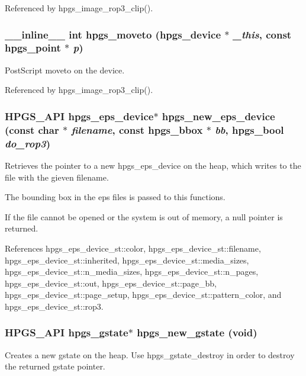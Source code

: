 Referenced by hpgs\_\-image\_\-rop3\_\-clip().

\subsubsection[{hpgs\_\-moveto}]{\setlength{\rightskip}{0pt plus 5cm}\_\-\_\-inline\_\-\_\- int hpgs\_\-moveto ({\bf hpgs\_\-device} $\ast$ {\em \_\-this}, \/  const {\bf hpgs\_\-point} $\ast$ {\em p})\hspace{0.3cm}{\ttfamily  [static]}}\label{group__device_ga02a5a6a75d00357beafb93105f1b2d87}
PostScript moveto on the device. 

Referenced by hpgs\_\-image\_\-rop3\_\-clip().

\subsubsection[{hpgs\_\-new\_\-eps\_\-device}]{\setlength{\rightskip}{0pt plus 5cm}HPGS\_\-API {\bf hpgs\_\-eps\_\-device}$\ast$ hpgs\_\-new\_\-eps\_\-device (const char $\ast$ {\em filename}, \/  const {\bf hpgs\_\-bbox} $\ast$ {\em bb}, \/  hpgs\_\-bool {\em do\_\-rop3})}\label{group__device_ga576f0a343948b709f8099bb0ec668ef6}
Retrieves the pointer to a new {\ttfamily hpgs\_\-eps\_\-device} on the heap, which writes to the file with the gieven {\ttfamily filename}.

The bounding box in the eps files is passed to this functions.

If the file cannot be opened or the system is out of memory, a null pointer is returned. 

References hpgs\_\-eps\_\-device\_\-st::color, hpgs\_\-eps\_\-device\_\-st::filename, hpgs\_\-eps\_\-device\_\-st::inherited, hpgs\_\-eps\_\-device\_\-st::media\_\-sizes, hpgs\_\-eps\_\-device\_\-st::n\_\-media\_\-sizes, hpgs\_\-eps\_\-device\_\-st::n\_\-pages, hpgs\_\-eps\_\-device\_\-st::out, hpgs\_\-eps\_\-device\_\-st::page\_\-bb, hpgs\_\-eps\_\-device\_\-st::page\_\-setup, hpgs\_\-eps\_\-device\_\-st::pattern\_\-color, and hpgs\_\-eps\_\-device\_\-st::rop3.

\subsubsection[{hpgs\_\-new\_\-gstate}]{\setlength{\rightskip}{0pt plus 5cm}HPGS\_\-API {\bf hpgs\_\-gstate}$\ast$ hpgs\_\-new\_\-gstate (void)}\label{group__device_gad474e8eca187bdde4ad1608d46029562}
Creates a new gstate on the heap. Use {\ttfamily hpgs\_\-gstate\_\-destroy} in order to destroy the returned gstate pointer.

